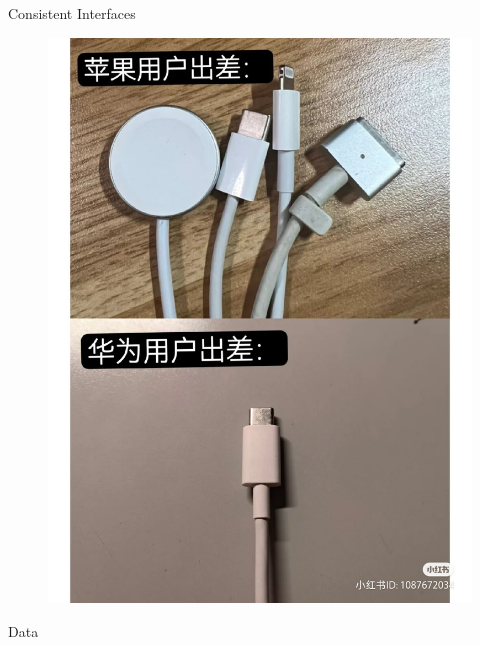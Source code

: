 \begin{frame}{Consistent Interfaces}
\begin{figure}[h]
\begin{minipage}{0.48\textwidth}
            \includegraphics[scale=0.135]{figures/interface2.jpg}
        \end{minipage}
    \end{figure}
\end{frame}

\begin{frame}{Data }
\end{frame}